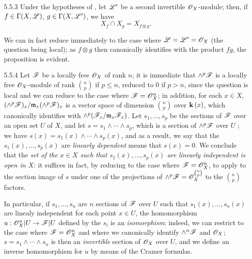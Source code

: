 \begin{env}{5.5.3}
\label{env-0.5.5.3}
Under the hypotheses of , let $\mathscr{L}'$ be a second invertible
$\mathscr{O}_X$-module; then, if $f\in\Gamma(X,\mathscr{L})$, $g\in\Gamma(X,\mathscr{L}')$, we have
\[
  X_f\cap X_g=X_{f\otimes g}.
\]

We can in fact reduce immediately to the case where $\mathscr{L}=\mathscr{L}'=\mathscr{O}_X$ (the question
being local); as $f\otimes g$ then canonically identifies with the product $fg$, the
proposition is evident.
\end{env}

\begin{env}{5.5.4}
\label{env-0.5.5.4}
Let $\mathscr{F}$ be a locally free $\mathscr{O}_X$ of rank $n$; it is immediate that $\wedge^p\mathscr{F}$ is
a locally free $\mathscr{O}_X$-module of rank $\binom{n}{p}$ if $p\leqslant n$, reduced to $0$ if
$p>n$, since the question is local and we can reduce to the case where $\mathscr{F}=\mathscr{O}_X^n$;
in addition, for each $x\in X$, $(\wedge^p\mathscr{F})_x/\mathfrak{m}_x(\wedge^p\mathscr{F})_x$ is a
vector space of dimension $\binom{n}{p}$ over $\mathbf{k}\,(x)$, which canonically identifies with
$\wedge^p(\mathscr{F}_x/\mathfrak{m}_x\mathscr{F}_x)$. Let $s_1,\dots,s_p$ be the sections of $\mathscr{F}$
over an open set $U$ of $X$, and let $s=s_1\wedge\cdots\wedge s_p$, which is a section of
$\wedge^p\mathscr{F}$ over $U$ ; we have $s(x)=s_1(x)\wedge\cdots\wedge s_p(x)$,
and as a result, we say that the $s_1(x),\dots,s_p(x)$ are \emph{linearly dependent} means
that $s(x)=0$. We conclude that the \emph{set of the $x\in X$ such that $s_1(x),\dots,s_p(x)$
are linearly independent is open in $X$}: it suffices in fact, by reducing to the case where
$\mathscr{F}=\mathscr{O}_X^n$, to apply  to the section image of $s$ under one of the
projections of $\wedge^p\mathscr{F}=\mathscr{O}_X^{\binom{n}{p}}$ to the $\binom{n}{p}$ factors.

In particular, if $s_1,\dots,s_n$ are $n$ sections of $\mathscr{F}$ over $U$ such that
$s_1(x),\dots,s_n(x)$ are linealy independent for each point $x\in U$, the homomorphism
$u:\mathscr{O}_X^n|U\to\mathscr{F}|U$ defined by the $s_i$  is an \emph{isomorphism}:
indeed, we can restrict to the case where $\mathscr{F}=\mathscr{O}_X^n$ and where we canonically identify
$\wedge^n\mathscr{F}$ and $\mathscr{O}_X$; $s=s_1\wedge\cdots\wedge s_n$ is then an \emph{invertible}
section of $\mathscr{O}_X$ over $U$, and we define an inverse homomorphism for $u$ by means of the
Cramer formulas.
\end{env}

